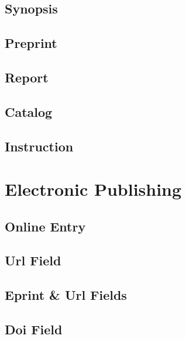 \documentclass[a4paper]{article}
\begin{document}
\subsection{Synopsis}
\subsection{Preprint}
\subsection{Report}
\subsection{Catalog}
\subsection{Instruction}
\section{Electronic Publishing}
\subsection{Online Entry}
\subsection{Url Field}
\subsection{Eprint \& Url Fields}
\subsection{Doi Field}
\end{document}
